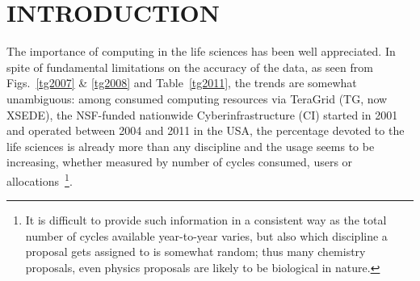 \documentclass[]{svjour3}
\begin{document}
\newif\ifdraft
\ifdraft
 \newcommand{\jkimnote}[1]{{\textcolor{green}   { ***Joohyun:   #1 }}}
 \newcommand{\jhanote}[1]{  {\textcolor{red}     { ***SJ: #1 }}}
  \newcommand{\smnote}[1]{  {\textcolor{red}     { ***Sharath: #1 }}}
 \newcommand{\todo}[1]{  {\textcolor{red}     { ***TODO: #1 }}}
 \newcommand{\fix}[1]{  {\textcolor{red}     { ***FIX: #1 }}}
\newcommand{\yyenote}[1]{  {\textcolor{blue}     { ***YYE: #1 }}}
 \newcommand{\reviewer}[1]{}
\else
 \newcommand{\reviewer}[1]{}
 \newcommand{\yyenote}[1]{}
 \newcommand{\jkimnote}[1]{}
 \newcommand{\smnote}[1]{}
 \newcommand{\jhanote}[1]{}
 \newcommand{\todo}[1]{  {\textcolor{red}     { ***TODO: #1 }}}
 \newcommand{\fix}[1]{}                                                                              
 \fi






\section{INTRODUCTION}


The importance of computing in the life sciences has been well
appreciated. %
In spite of fundamental limitations on the accuracy of the data, as
seen from Figs.~\ref{tg2007} \& \ref{tg2008} and Table~\ref{tg2011},
the trends are somewhat unambiguous: among consumed computing
resources via TeraGrid (TG, now XSEDE), the NSF-funded nationwide
Cyberinfrastructure (CI) started in 2001 and operated between 2004 and
2011 in the USA, the percentage devoted to the life sciences is
already more than any discipline and the usage seems to be increasing,
whether measured by number of cycles consumed, users or
allocations~\footnote{It is difficult to provide such information in a
  consistent way as the total number of cycles available year-to-year
  varies, but also which discipline a proposal gets assigned to is
  somewhat random; thus many chemistry proposals, even physics
  proposals are likely to be biological in nature.}.
\end{document}
